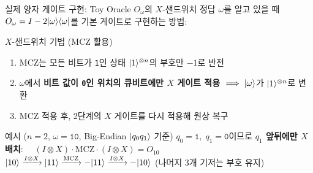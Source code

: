 \documentclass[aspectratio=169, 10pt]{beamer}
\begin{document}
\begin{frame}{실제 양자 게이트 구현: Toy Oracle $O_\omega$의 $X$-샌드위치}
    정답 $\omega$를 알고 있을 때 $O_\omega = I - 2|\omega\rangle\langle\omega|$를 기본 게이트로 구현하는 방법:
    \pause
    \vspace{0.1cm}
    \begin{qcblock}{$X$-샌드위치 기법 ($\mathrm{MCZ}$ 활용)}
        \begin{enumerate}
            \item $\mathrm{MCZ}$는 모든 비트가 \texttt{1}인 상태 $|1\rangle^{\otimes n}$의 부호만 $-1$로 반전
            \pause
            \item $\omega$에서 \textbf{비트 값이 \texttt{0}인 위치의 큐비트에만 $X$ 게이트 적용} $\implies |\omega\rangle$가 $|1\rangle^{\otimes n}$로 변환
            \pause
            \item $\mathrm{MCZ}$ 적용 후, 2단계의 $X$ 게이트를 다시 적용해 원상 복구
        \end{enumerate}
    \end{qcblock}
    \pause
    \vspace{0.1cm}
    \begin{qctip}{예시 ($n=2$, $\omega=\texttt{10}$, Big-Endian $|q_0 q_1\rangle$ 기준)}
        $q_0=\texttt{1}, \; q_1=\texttt{0}$이므로 \textbf{$q_1$ 앞뒤에만 $X$ 배치}: $\quad (I \otimes X) \cdot \mathrm{MCZ} \cdot (I \otimes X) = O_{10}$\\
        $|10\rangle \xrightarrow{I\otimes X} |11\rangle \xrightarrow{\mathrm{MCZ}} -|11\rangle \xrightarrow{I\otimes X} -|10\rangle$ (나머지 3개 기저는 부호 유지)
    \end{qctip}
\end{frame}
\end{document}
